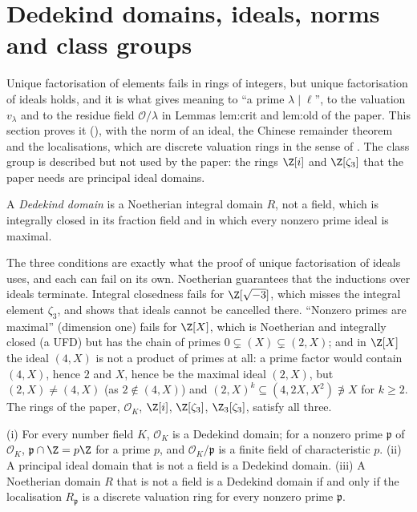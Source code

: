 \section{Dedekind domains, ideals, norms and class groups}\label{sec:ant:dedekind}

Unique factorisation of elements fails in rings of integers, but unique factorisation of ideals holds, and it is what gives meaning to
``a prime $\lambda\mid\ell$'', to the valuation $v_\lambda$ and to the residue field $\mathcal O/\lambda$ in Lemmas lem:crit and lem:old of the paper.
This section proves it (), with the norm of an ideal, the Chinese remainder theorem and the localisations,
which are discrete valuation rings in the sense of . The class group is described but not used by the paper: the rings
$\Z[i]$ and $\Z[\zeta_3]$ that the paper needs are principal ideal domains.

\begin{definition}\label{def:ant:dedekind}
A \emph{Dedekind domain} is a Noetherian integral domain $R$, not a field, which is integrally closed in its fraction field and in which every
nonzero prime ideal is maximal.
\end{definition}

The three conditions are exactly what the proof of unique factorisation of ideals uses, and each can fail on its own. Noetherian guarantees that the
inductions over ideals terminate. Integral closedness fails for $\Z[\sqrt{-3}]$, which misses the integral element $\zeta_3$, and
 shows that ideals cannot be cancelled there. ``Nonzero primes are maximal'' (dimension one) fails for $\Z[X]$, which is
Noetherian and integrally closed (a UFD) but has the chain of primes $0\subsetneq(X)\subsetneq(2,X)$; and in $\Z[X]$ the ideal $(4,X)$ is not a product of
primes at all: a prime factor would contain $(4,X)$, hence $2$ and $X$, hence be the maximal ideal $(2,X)$, but $(2,X)\ne(4,X)$ (as $2\notin(4,X)$) and
$(2,X)^k\subseteq(4,2X,X^2)\not\ni X$ for $k\ge2$. The rings of the paper, $\mathcal O_K$, $\Z[i]$, $\Z[\zeta_3]$, $\Z_3[\zeta_3]$,
satisfy all three.

\begin{theorem}\label{thm:ant:dedekind}
(i) For every number field $K$, $\mathcal O_K$ is a Dedekind domain; for a nonzero prime $\mathfrak p$ of $\mathcal O_K$, $\mathfrak p\cap\Z=p\Z$ for a
prime $p$, and $\mathcal O_K/\mathfrak p$ is a finite field of characteristic $p$. (ii) A principal ideal domain that is not a field is a Dedekind
domain. (iii) A Noetherian domain $R$ that is not a field is a Dedekind domain if and only if the localisation $R_{\mathfrak p}$ is a discrete
valuation ring for every nonzero prime $\mathfrak p$.
\end{theorem}


